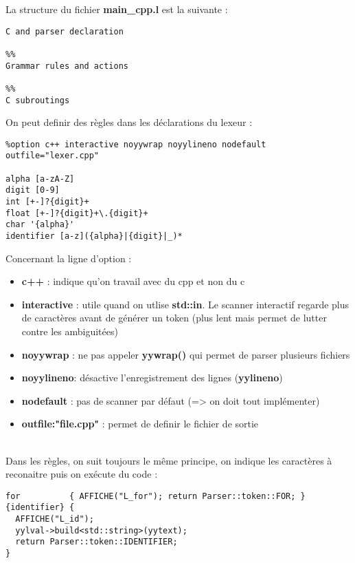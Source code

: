 \documentclass[a4paper]{article}
\begin{document}
La structure du fichier \textbf{main\_cpp.l} est la suivante :

\begin{lstlisting}
C and parser declaration

%%
Grammar rules and actions

%%
C subroutings
\end{lstlisting}\leavevmode\newline


\noindent
On peut definir des règles dans les déclarations du lexeur :

\begin{lstlisting}
%option c++ interactive noyywrap noyylineno nodefault outfile="lexer.cpp"

alpha [a-zA-Z]
digit [0-9]
int [+-]?{digit}+
float [+-]?{digit}+\.{digit}+
char '{alpha}'
identifier [a-z]({alpha}|{digit}|_)*
\end{lstlisting}\leavevmode\newline

\noindent
Concernant la ligne d'option :
\begin{itemize}
\item \textbf{c++} : indique qu'on travail avec du cpp et non du c
\item \textbf{interactive} : utile quand on utlise \textbf{std::in}. Le scanner interactif regarde plus de caractères avant de générer un token (plus lent mais permet de lutter contre les ambiguitées)
\item \textbf{noyywrap} : ne pas appeler \textbf{yywrap()} qui permet de parser plusieurs fichiers
\item \textbf{noyylineno}: désactive l'enregistrement des lignes (\textbf{yylineno})
\item \textbf{nodefault} : pas de scanner par défaut (=> on doit tout implémenter)
\item \textbf{outfile:"file.cpp"} : permet de definir le fichier de sortie
\end{itemize}\leavevmode\\[3\baselineskip]


\noindent
Dans les règles, on suit toujours le même principe, on indique les caractères à reconaitre puis on exécute du code :\\

\begin{lstlisting}
for          { AFFICHE("L_for"); return Parser::token::FOR; }
{identifier} {
  AFFICHE("L_id");
  yylval->build<std::string>(yytext);
  return Parser::token::IDENTIFIER;
}
\end{lstlisting}\leavevmode\newline
\end{document}
